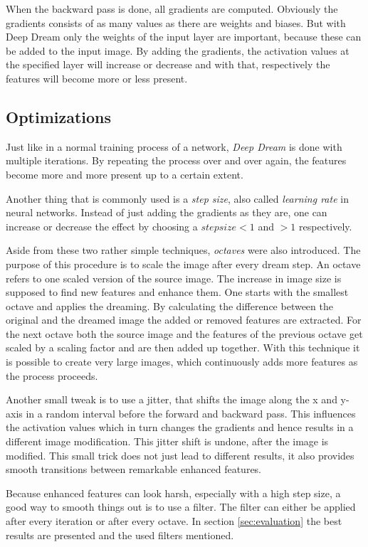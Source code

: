 When the backward pass is done, all gradients are computed.
Obviously the gradients consists of as many values as there are weights and biases.
But with Deep Dream only the weights of the input layer are important, because these can be added to the input image.
By adding the gradients, the activation values at the specified layer will increase or decrease and with that, respectively the features will become more or less present.

\subsection{Optimizations}
\label{sec:optimizations}
Just like in a normal training process of a network, \emph{Deep Dream} is done with multiple iterations.
By repeating the process over and over again, the features become more and more present up to a certain extent.

Another thing that is commonly used is a \emph{step size}, also called \emph{learning rate} in neural networks.
Instead of just adding the gradients as they are, one can increase or decrease the effect by choosing a $step size < 1$ and $> 1$ respectively.

Aside from these two rather simple techniques, \emph{octaves} were also introduced.
The purpose of this procedure is to scale the image after every dream step.
An octave refers to one scaled version of the source image.
The increase in image size is supposed to find new features and enhance them.
One starts with the smallest octave and applies the dreaming.
By calculating the difference between the original and the dreamed image the added or removed features are extracted.
For the next octave both the source image and the features of the previous octave get scaled by a scaling factor and are then added up together.
With this technique it is possible to create very large images, which continuously adds more features as the process proceeds.

 
Another small tweak is to use a jitter, that shifts the image along the x and y-axis in a random interval before the forward and backward pass.
This influences the activation values which in turn changes the gradients and hence results in a different image modification.
This jitter shift is undone, after the image is modified.
This small trick does not just lead to different results, it also provides smooth transitions between remarkable enhanced features.

Because enhanced features can look harsh, especially with a high step size, a good way to smooth things out is to use a filter. 
The filter can either be applied after every iteration or after every octave.
In section \ref{sec:evaluation} the best results are presented and the used filters mentioned.


